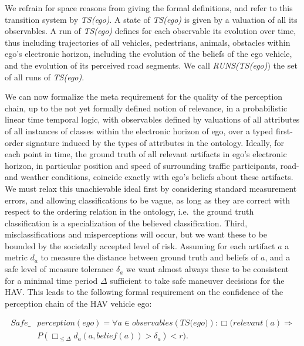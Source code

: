 We refrain for space reasons from giving the formal definitions, and refer to this transition system by \textit{TS(ego)}. A state of \textit{TS(ego)} is given by a valuation of all its observables. A run of \textit{TS(ego)} defines for each observable its evolution over time, thus including trajectories of all vehicles, pedestrians, animals, obstacles within ego's electronic horizon, including the evolution of the beliefs of the ego vehicle, and the evolution of its perceived road segments. We call \textit{RUNS(TS(ego)}) the set of all runs of \textit{TS(ego)}.

We can now formalize the meta requirement for the quality of the perception chain, up to the not yet formally defined notion of relevance, in a probabilistic linear time temporal logic, with observables defined by valuations of all attributes of all instances of classes within the electronic horizon of ego, over a typed first-order signature induced by the types of attributes in the ontology. Ideally, for each point in time, the ground truth of all relevant artifacts in ego's electronic horizon, in particular position and speed of surrounding traffic participants, road- and weather conditions, coincide exactly with ego's beliefs about these artifacts. We must relax this unachievable ideal first by considering standard measurement errors, and allowing classifications to be vague, as long as they are correct with respect to the ordering relation in the ontology, i.e.\ the ground truth classification is a specialization of the believed classification. Third, misclassifications and misperceptions will occur, but we want these to be bounded by the societally accepted level of risk. Assuming for each artifact $a$ a metric $d_a$ to measure the distance between ground truth and beliefs of $a$, and a safe level of measure tolerance $\delta_a$ we want almost always these to be consistent for a minimal time period $\Delta$ sufficient to take safe maneuver decisions for the HAV. This leads to the following formal requirement on the confidence of the perception chain of the HAV vehicle ego:

\begin{align}\label{eq:safeperception}
	\textit{Safe}\_ &\textit{perception}(ego) =\forall a \in \textit{observables}(\textit{TS(ego)}):  \Box (\textit{relevant}(a) \Rightarrow\\ 
			&P(\Box_{\leq\Delta}d_a(a, \textit{belief}(a))> \delta_a) < r).\nonumber
\end{align}

